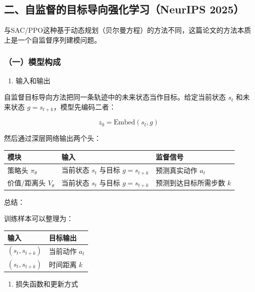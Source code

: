 \hypertarget{ux4e8cux81eaux76d1ux7763ux7684ux76eeux6807ux5bfcux5411ux5f3aux5316ux5b66ux4e60neurips-2025}{%
\subsection{二、自监督的目标导向强化学习（NeurIPS 2025）}\label{ux4e8cux81eaux76d1ux7763ux7684ux76eeux6807ux5bfcux5411ux5f3aux5316ux5b66ux4e60neurips-2025}}

与SAC/PPO这种基于动态规划（贝尔曼方程）的方法不同，这篇论文的方法本质上是一个自监督序列建模问题。

\hypertarget{ux4e00ux6a21ux578bux6784ux6210}{%
\subsubsection{（一）模型构成}\label{ux4e00ux6a21ux578bux6784ux6210}}

\begin{enumerate}
\def\labelenumi{\arabic{enumi}.}
\tightlist
\item
  输入和输出
\end{enumerate}

自监督目标导向方法把同一条轨迹中的未来状态当作目标。给定当前状态 \(s_t\) 和未来状态 \(g=s_{t+k}\)，模型先编码二者：

\[
z_0=\mathrm{Embed}(s_t,g)
\]

然后通过深层网络输出两个头：

\begin{longtable}[]{@{}lll@{}}
\toprule
模块 & 输入 & 监督信号 \\
\midrule
\endhead
策略头 \(\pi_\theta\) & 当前状态 \(s_t\) 与目标 \(g=s_{t+k}\) & 预测真实动作 \(a_t\) \\
价值/距离头 \(V_\theta\) & 当前状态 \(s_t\) 与目标 \(g=s_{t+k}\) & 预测到达目标所需步数 \(k\) \\
\bottomrule
\end{longtable}

总结：

训练样本可以整理为：

\begin{longtable}[]{@{}ll@{}}
\toprule
输入 & 目标输出 \\
\midrule
\endhead
\((s_t,s_{t+k})\) & 当前动作 \(a_t\) \\
\((s_t,s_{t+k})\) & 时间距离 \(k\) \\
\bottomrule
\end{longtable}

\begin{enumerate}
\def\labelenumi{\arabic{enumi}.}
\setcounter{enumi}{1}
\tightlist
\item
  损失函数和更新方式
\end{enumerate}

